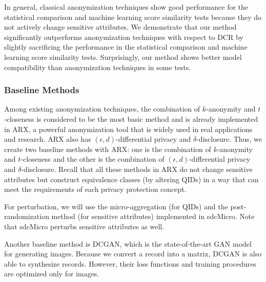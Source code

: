In general, classical anonymization techniques show good performance for the statistical comparison and machine learning score similarity tests because they do not actively change sensitive attributes. We demonstrate that our method significantly outperforms anonymization techniques with respect to DCR by slightly sacrificing the performance in the statistical comparison and machine learning score similarity tests. Surprisingly, our method shows better model compatibility  than anonymization techniques in some tests.

\subsubsection{Baseline Methods}
Among existing anonymization techniques, the combination of $k$-anonymity and $t$-closeness is considered to be the most basic method and is already implemented in ARX, a powerful anonymization tool that is widely used in real applications and research. ARX also has $(\epsilon,d)$-differential privacy and $\delta$-disclosure. Thus, we create two baseline methods with ARX: one is the combination of $k$-anonymity and $t$-closeness and the other is the combination of $(\epsilon,d)$-differential privacy and $\delta$-disclosure.  Recall that all these methods in ARX do not change sensitive attributes but construct equivalence classes (by altering QIDs) in a way that can meet the requirements of each privacy protection concept.

For perturbation, we will use the micro-aggregation (for QIDs) and the post-randomization method (for sensitive attributes) implemented in sdcMicro. Note that sdcMicro perturbs sensitive attributes as well.

Another baseline method is DCGAN, which is the state-of-the-art GAN model for generating images. Because we convert a record into a matrix, DCGAN is also able to synthesize records. However, their loss functions and training procedures are optimized only for images.


